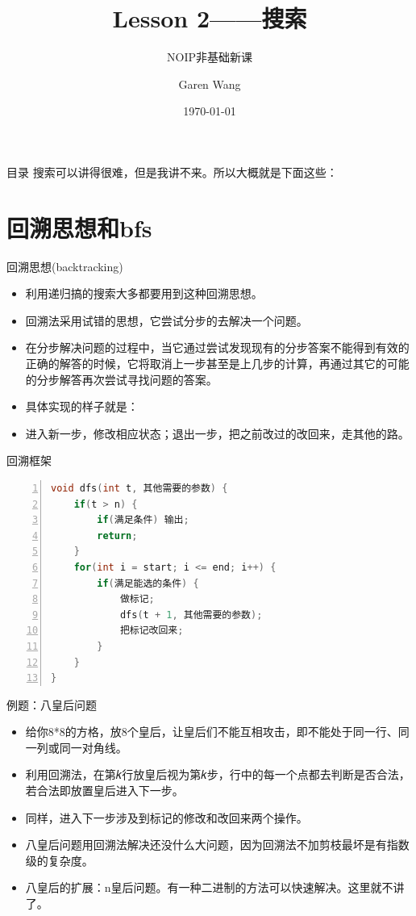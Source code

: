 \documentclass{bemaer}[UTF-8]
\title{Lesson 2——搜索}
\subtitle{NOIP非基础新课}
\author{Garen Wang}
\date{\today}
\begin{document}
\maketitle
\begin{frame}{目录}
搜索可以讲得很难，但是我讲不来。所以大概就是下面这些：
\tableofcontents
\end{frame}

\section{回溯思想和bfs}

\begin{frame}{回溯思想(backtracking)}
\begin{itemize}
  \item 利用递归搞的搜索大多都要用到这种回溯思想。
  \item 回溯法采用试错的思想，它尝试分步的去解决一个问题。
  \item 在分步解决问题的过程中，当它通过尝试发现现有的分步答案不能得到有效的正确的解答的时候，它将取消上一步甚至是上几步的计算，再通过其它的可能的分步解答再次尝试寻找问题的答案。
  \item 具体实现的样子就是：
  \item 进入新一步，修改相应状态；退出一步，把之前改过的改回来，走其他的路。
\end{itemize}
\end{frame}

\begin{frame}{回溯框架}
\begin{lstlisting}[language = C++, numbers=left,
numberstyle=\tiny,keywordstyle=\color{blue!70},
commentstyle=\color{red!50!green!50!blue!50},frame=shadowbox,
rulesepcolor=\color{red!20!green!20!blue!20},basicstyle=\ttfamily]
void dfs(int t, 其他需要的参数) {
    if(t > n) {
        if(满足条件) 输出;
        return;
    }
    for(int i = start; i <= end; i++) {
        if(满足能选的条件) {
            做标记;
            dfs(t + 1, 其他需要的参数);
            把标记改回来;
        }
    }
}
\end{lstlisting}
\end{frame}

\begin{frame}{例题：八皇后问题}
\begin{itemize}
\item 给你8*8的方格，放8个皇后，让皇后们不能互相攻击，即不能处于同一行、同一列或同一对角线。
\item 利用回溯法，在第𝑘行放皇后视为第𝑘步，行中的每一个点都去判断是否合法，若合法即放置皇后进入下一步。
\item 同样，进入下一步涉及到标记的修改和改回来两个操作。
\item 八皇后问题用回溯法解决还没什么大问题，因为回溯法不加剪枝最坏是有指数级的复杂度。
\item 八皇后的扩展：n皇后问题。有一种二进制的方法可以快速解决。这里就不讲了。
\end{itemize}
\end{frame}
\end{document}
